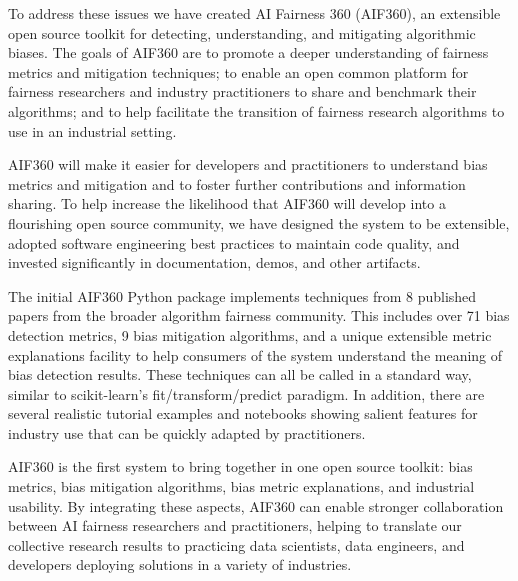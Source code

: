 \documentclass{article}
\begin{document}
To address these issues we have created AI Fairness 360 (AIF360),
an extensible open source toolkit for detecting, understanding, and mitigating algorithmic biases. The goals of AIF360 are  to promote a deeper understanding of fairness metrics and mitigation techniques; to enable an open common platform for fairness researchers and industry practitioners to share and benchmark their algorithms; and to help facilitate the transition of fairness research algorithms to use in an industrial setting.


AIF360 will make it easier for developers and practitioners to understand bias metrics and mitigation and to foster further contributions and information sharing. 
To help increase the likelihood that AIF360 will develop into a flourishing open source community, we have designed the system to be extensible, adopted software engineering best practices to maintain code quality, and invested significantly in documentation, demos, and other artifacts.

The initial AIF360 Python package implements techniques from 8 published papers from the broader algorithm fairness community.  This includes over 71 bias detection metrics, 9 bias mitigation algorithms, and a unique extensible metric explanations facility to help consumers of the system understand the meaning of bias detection results.  These techniques can all be called in a standard way, similar to scikit-learn's fit/transform/predict paradigm. In addition, there are several realistic tutorial examples and notebooks showing salient features for industry use that can be quickly adapted by practitioners. 


AIF360 is the first system to bring together in one open source toolkit: bias metrics, bias mitigation algorithms, bias metric explanations, and industrial usability. By integrating these aspects, AIF360 can enable stronger collaboration between AI fairness researchers and practitioners, helping to translate our collective research results to practicing data scientists, data engineers, and developers deploying solutions in a variety of industries.
\end{document}
